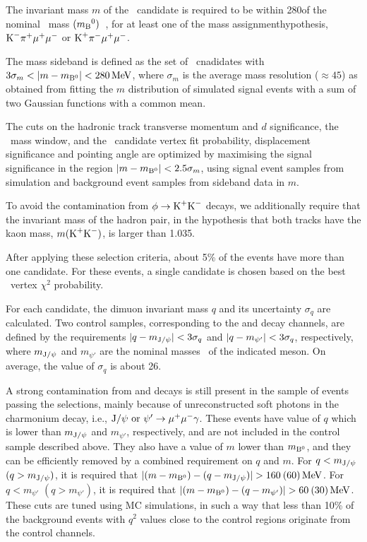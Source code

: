The invariant mass $m$ of the \PBz\ candidate is required to be within 280\MeV of the nominal \PBz\ mass $(m_{\textrm{B}}{}^{0})$~\cite{PDG}, for at least one of the mass assignmenthypothesis, $\textrm{K}^{-}\pi^{+}\mu^{+}\mu^{-}$ or $\textrm{K}^{+}\pi^{-}\mu^{+}\mu^{-}$.

The mass sideband is defined as the set of \PBz\ cnadidates with $3\sigma_m < \lvert m-m_{{\textrm{B}}{}^{0}}\rvert < 280\,\textrm{MeV}$, where $\sigma_m$ is the average mass resolution (${\approx}45$\MeV) as obtained from fitting the $m$ distribution of simulated signal events with a sum of two Gaussian functions with a common mean.

The cuts on the hadronic track transverse momentum and $d$ significance, the \cPKstz\ mass window, and the \PBz\ candidate vertex fit probability, displacement significance and pointing angle are optimized by maximising the signal significance in the region $\lvert m-m_{{\textrm{B}}{}^{0}}\rvert < 2.5\sigma_m$, using signal event samples from simulation and background event samples from sideband data in $m$.

To avoid the contamination from $\phi\to\textrm{K}^{+}\textrm{K}^{-}$ decays, we additionally require that the invariant mass of the hadron pair, in the hypothesis that both tracks have the kaon mass, $m(\textrm{K}^{+}\textrm{K}^{-})$, is larger than 1.035\GeV.

After applying these selection criteria, about 5\% of the events have more than one candidate.
For these events, a single candidate is chosen based on the best \PBz\ vertex $\chi^2$ probability.

For each candidate, the dimuon invariant mass $q$ and its uncertainty $\sigma_{q}$ are calculated.
Two control samples, corresponding to the \BtoKstJpsi and \BtoKstpsip decay channels, are defined by the requirements $\lvert q - m_{\textrm{J}/\psi}\rvert < 3\sigma_{q}$ and $\lvert q - m_{\psi'}\rvert < 3\sigma_{q}$, respectively, where $m_{\textrm{J}/\psi}$ and $m_{\psi'}$ are the nominal masses~\cite{PDG} of the indicated meson.
On average, the value of $\sigma_{q}$ is about 26\MeV.

A strong contamination from \BtoKstJpsi and \BtoKstpsip decays is still present in the sample of events passing the selections, mainly because of unreconstructed soft photons in the charmonium decay, i.e., $\textrm{J}/\psi\ {\rm or}\ \psi' \to \mu^{+} \mu^{-} \gamma$.
These events have value of $q$ which is lower than $m_{\textrm{J}/\psi}$ and $m_{\psi'}$, respectively, and are not included in the control sample described above.
They also have a value of $m$ lower than $m_{{\textrm{B}}{}^{0}}$, and they can be efficiently removed by a combined requirement on $q$ and $m$.
For $q<m_{\textrm{J}/\psi}$ $(q>m_{\textrm{J}/\psi})$, it is required that $\lvert(m-m_{{\textrm{B}}{}^{0}})-(q-m_{\textrm{J}/\psi})\rvert>160\: (60)\,\textrm{MeV}$.
For $q<m_{\psi'}$ $(q>m_{\psi'})$, it is required that $\lvert(m-m_{{\textrm{B}}{}^{0}})-(q-m_{\psi'})\rvert>60\: (30)\,\textrm{MeV}$.
These cuts are tuned using MC simulations, in such a way that less than 10\% of the background events with $q^2$ values close to the control regions originate from the control channels.

